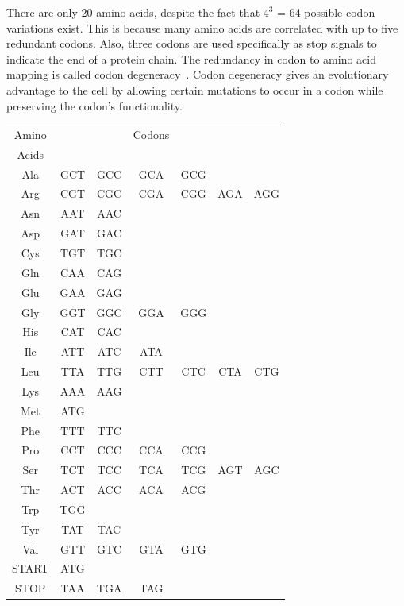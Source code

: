 \documentclass[USenglish,oneside,twocolumn]{article}
\begin{document}
There are only 20 amino acids, despite the fact that $4^3$ = 64 possible codon variations exist. This is because many amino acids are correlated with up to five redundant codons. Also, three codons are used specifically as stop signals to indicate the end of a protein chain. The redundancy in codon to amino acid mapping is called codon degeneracy~\cite{WBBGLL2008}. Codon degeneracy gives an evolutionary advantage to the cell by allowing certain mutations to occur in a codon while preserving the codon’s functionality.

\begin{center}
 \begin{tabular}{||c || c c c c c c||}
 \hline
 Amino & & & Codons & & &\\ [0.5ex]
 Acids & & & & & &\\ [0.5ex]
 \hline\hline
 Ala & GCT & GCC & GCA & GCG & &\\
 \hline
 Arg & CGT & CGC & CGA & CGG & AGA & AGG \\
 \hline
 Asn & AAT & AAC & & & &\\
 \hline
 Asp & GAT & GAC & & & &\\
 \hline
 Cys & TGT & TGC & & & &\\
 \hline
 Gln & CAA & CAG & & & &\\
 \hline
 Glu & GAA & GAG & & & &\\
 \hline
 Gly & GGT & GGC & GGA & GGG & &\\
 \hline
 His & CAT & CAC & & & &\\
 \hline
 Ile & ATT & ATC & ATA & & &\\
 \hline
 Leu & TTA & TTG & CTT & CTC & CTA & CTG \\
 \hline
 Lys & AAA & AAG & & & &\\
 \hline
 Met & ATG & & & & &\\
 \hline
 Phe & TTT & TTC & & & &\\
 \hline
 Pro & CCT & CCC & CCA & CCG & &\\
 \hline
 Ser & TCT & TCC & TCA & TCG & AGT & AGC \\
 \hline
 Thr & ACT & ACC & ACA & ACG & &\\
 \hline
 Trp & TGG & & & & &\\
 \hline
 Tyr & TAT & TAC & & & &\\
 \hline
 Val & GTT & GTC & GTA & GTG & &\\
 \hline
 START & ATG & & & & &\\
 \hline
 STOP & TAA & TGA & TAG & & &\\[1ex]
 \hline
\end{tabular}
\end{center}
\end{document}

